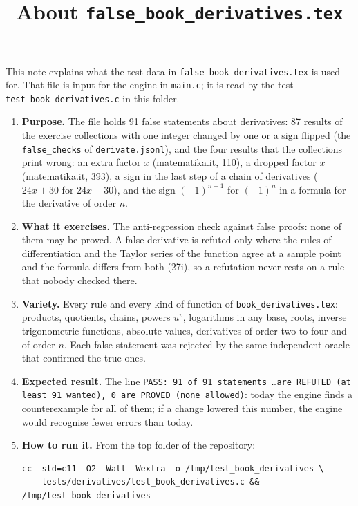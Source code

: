 \documentclass[11pt,a4paper]{article}
\title{About \texttt{false\_book\_derivatives.tex}}
\author{}
\date{}
\begin{document}
\maketitle
This note explains what the test data in \texttt{false\_book\_derivatives.tex} is used for. That file is input for the engine in \texttt{main.c}; it is read by the test \texttt{test\_book\_derivatives.c} in this folder.

\begin{enumerate}
\item \textbf{Purpose.} The file holds 91 false statements about derivatives: 87 results of the exercise collections with one integer changed by one or a sign flipped (the \texttt{false\_checks} of \texttt{derivate.jsonl}), and the four results that the collections print wrong: an extra factor $x$ (matematika.it, 110), a dropped factor $x$ (matematika.it, 393), a sign in the last step of a chain of derivatives ($24x + 30$ for $24x - 30$), and the sign $(-1)^{n+1}$ for $(-1)^{n}$ in a formula for the derivative of order $n$.

\item \textbf{What it exercises.} The anti-regression check against false proofs: none of them may be proved. A false derivative is refuted only where the rules of differentiation and the Taylor series of the function agree at a sample point and the formula differs from both (27i), so a refutation never rests on a rule that nobody checked there.

\item \textbf{Variety.} Every rule and every kind of function of \texttt{book\_derivatives.tex}: products, quotients, chains, powers $u^{v}$, logarithms in any base, roots, inverse trigonometric functions, absolute values, derivatives of order two to four and of order $n$. Each false statement was rejected by the same independent oracle that confirmed the true ones.

\item \textbf{Expected result.} The line \texttt{PASS: 91 of 91 statements \ldots are REFUTED (at least 91 wanted), 0 are PROVED (none allowed)}: today the engine finds a counterexample for all of them; if a change lowered this number, the engine would recognise fewer errors than today.

\item \textbf{How to run it.} From the top folder of the repository:
\begin{verbatim}
cc -std=c11 -O2 -Wall -Wextra -o /tmp/test_book_derivatives \
    tests/derivatives/test_book_derivatives.c && /tmp/test_book_derivatives
\end{verbatim}
\end{enumerate}
\end{document}
